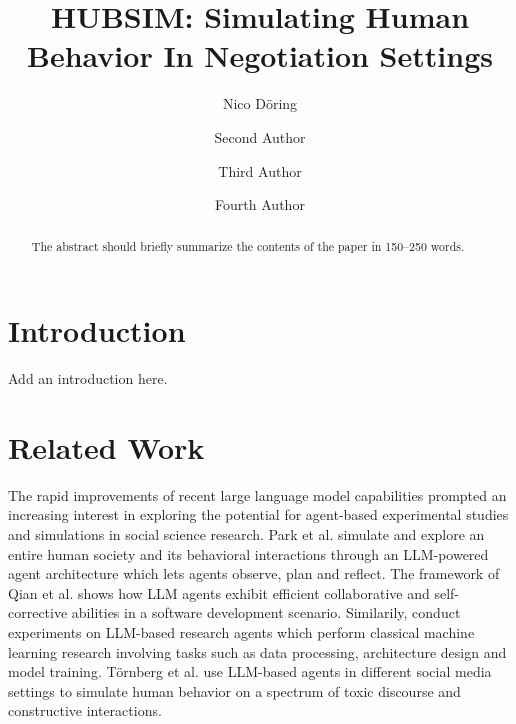 \documentclass[runningheads]{llncs}
\begin{document}
%
\title{HUBSIM: Simulating Human Behavior In Negotiation Settings}
%
%
\author{Nico Döring \and
Second Author \and
Third Author \and Fourth Author}
%
%
%
\maketitle              %
%
\begin{abstract}
The abstract should briefly summarize the contents of the paper in
150--250 words.

\end{abstract}
%
%
%
\section{Introduction}

Add an introduction here.


\section{Related Work}

The rapid improvements of recent large language model capabilities prompted an increasing interest in exploring the potential for agent-based experimental studies and simulations in social science research. Park et al. \cite{park_generative_2023}  simulate and explore an entire human society and its behavioral interactions through an LLM-powered agent architecture which lets agents observe, plan and reflect. The framework of Qian et al. \cite{qian_communicative_2023} shows how LLM agents exhibit efficient collaborative and self-corrective abilities in a software development scenario. Similarily, \cite{huang_benchmarking_2023} conduct experiments on LLM-based research agents which perform classical machine learning research involving tasks such as data processing, architecture design and model training. Törnberg et al. \cite{tornberg_simulating_2023} use LLM-based agents in different social media settings to simulate human behavior on a spectrum of toxic discourse and constructive interactions.
\end{document}
